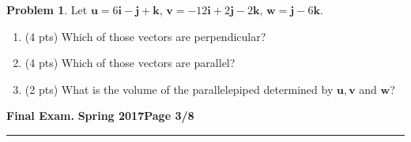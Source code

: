 \documentclass[12pt]{article}
\theoremstyle{definition}
\newtheorem{problem}{Problem}
\begin{document}
\bigskip
\begin{problem}
Let $\boldsymbol{u} = 6\boldsymbol{i}-\boldsymbol{j}+\boldsymbol{k}$, $\boldsymbol{v}=-12\boldsymbol{i}+2\boldsymbol{j}-2\boldsymbol{k}$, $\boldsymbol{w} = \boldsymbol{j}-6\boldsymbol{k}$.  
\begin{enumerate}
\item (4 pts) Which of those vectors are perpendicular? 
\vspace{4cm}
\begin{flushright}
\end{flushright}
\item (4 pts) Which of those vectors are parallel?
\vspace{4cm}
\begin{flushright}
\end{flushright}
\item (2 pts) What is the volume of the parallelepiped determined by $\boldsymbol{u}, \boldsymbol{v}$ and $\boldsymbol{w}$?
\vspace{5cm}
\begin{flushright}
\end{flushright}
\end{enumerate}
\end{problem}
\newpage

\hfill{\large\bf Final Exam.}\hfill{\large\bf
  Spring 2017}\hfill{\large\bf Page 3/8}\hrule
\end{document}

